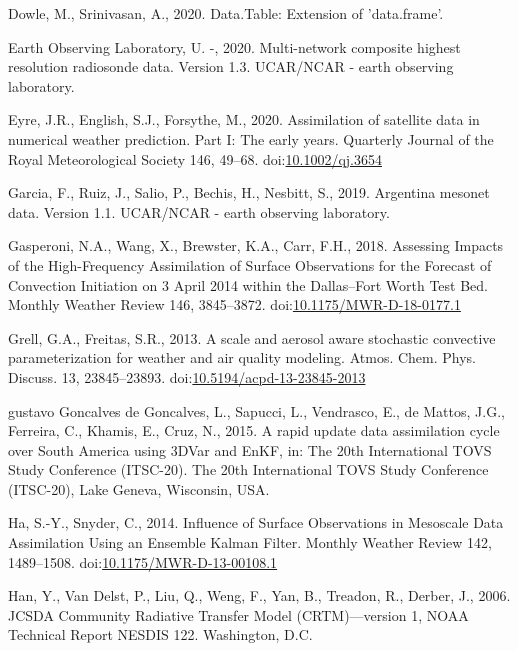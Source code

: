 \documentclass[authoryear,preprint,review,12pt]{elsarticle} %
\begin{document}
\leavevmode\hypertarget{ref-dowle2020}{}%
Dowle, M., Srinivasan, A., 2020. Data.Table: Extension of 'data.frame'.

\leavevmode\hypertarget{ref-sondeos}{}%
Earth Observing Laboratory, U. -, 2020. Multi-network composite highest resolution radiosonde data. Version 1.3. UCAR/NCAR - earth observing laboratory.

\leavevmode\hypertarget{ref-eyre2020}{}%
Eyre, J.R., English, S.J., Forsythe, M., 2020. Assimilation of satellite data in numerical weather prediction. Part I: The early years. Quarterly Journal of the Royal Meteorological Society 146, 49--68. doi:\href{https://doi.org/10.1002/qj.3654}{10.1002/qj.3654}

\leavevmode\hypertarget{ref-garcia2019}{}%
Garcia, F., Ruiz, J., Salio, P., Bechis, H., Nesbitt, S., 2019. Argentina mesonet data. Version 1.1. UCAR/NCAR - earth observing laboratory.

\leavevmode\hypertarget{ref-gasperoni2018}{}%
Gasperoni, N.A., Wang, X., Brewster, K.A., Carr, F.H., 2018. Assessing Impacts of the High-Frequency Assimilation of Surface Observations for the Forecast of Convection Initiation on 3 April 2014 within the Dallas--Fort Worth Test Bed. Monthly Weather Review 146, 3845--3872. doi:\href{https://doi.org/10.1175/MWR-D-18-0177.1}{10.1175/MWR-D-18-0177.1}

\leavevmode\hypertarget{ref-grell2013}{}%
Grell, G.A., Freitas, S.R., 2013. A scale and aerosol aware stochastic convective parameterization for weather and air quality modeling. Atmos. Chem. Phys. Discuss. 13, 23845--23893. doi:\href{https://doi.org/10.5194/acpd-13-23845-2013}{10.5194/acpd-13-23845-2013}

\leavevmode\hypertarget{ref-goncalvesdegoncalves2015}{}%
gustavo Goncalves de Goncalves, L., Sapucci, L., Vendrasco, E., de Mattos, J.G., Ferreira, C., Khamis, E., Cruz, N., 2015. A rapid update data assimilation cycle over South America using 3DVar and EnKF, in: The 20th International TOVS Study Conference (ITSC-20). The 20th International TOVS Study Conference (ITSC-20), Lake Geneva, Wisconsin, USA.

\leavevmode\hypertarget{ref-ha2014}{}%
Ha, S.-Y., Snyder, C., 2014. Influence of Surface Observations in Mesoscale Data Assimilation Using an Ensemble Kalman Filter. Monthly Weather Review 142, 1489--1508. doi:\href{https://doi.org/10.1175/MWR-D-13-00108.1}{10.1175/MWR-D-13-00108.1}

\leavevmode\hypertarget{ref-han2006}{}%
Han, Y., Van Delst, P., Liu, Q., Weng, F., Yan, B., Treadon, R., Derber, J., 2006. JCSDA Community Radiative Transfer Model (CRTM)---version 1, NOAA Technical Report NESDIS 122. Washington, D.C.
\end{document}
